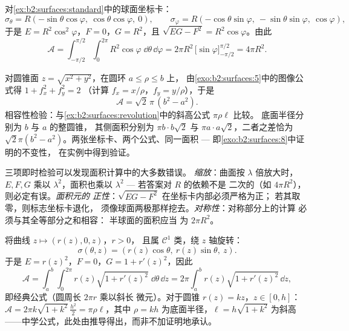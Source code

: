 \begin{example}[球面的面积]\label{ex:b2:surfaces:spherearea}
对\cref{ex:b2:surfaces:standard}中的球面坐标卡：
\[
\sigma_\theta = R(-\sin\theta\cos\varphi,\
\cos\theta\cos\varphi,\ 0),
\qquad
\sigma_\varphi = R(-\cos\theta\sin\varphi,\
-\sin\theta\sin\varphi,\ \cos\varphi),
\]
于是 $E = R^2\cos^2\varphi$，$F = 0$，$G = R^2$，且 $\sqrt{EG - F^2}
= R^2\cos\varphi$。由此
\[
\mathcal{A}
= \int_{-\pi/2}^{\pi/2}\!\!\int_0^{2\pi}
R^2\cos\varphi\;\dd\theta\,\dd\varphi
= 2\pi R^2\,\bigl[\sin\varphi\bigr]_{-\pi/2}^{\pi/2}
= \boxed{4\pi R^2} .
\]
\end{example}

\begin{example}[圆锥，
与中学公式核对]\label{ex:b2:surfaces:conearea}
对圆锥面 $z = \sqrt{x^2 + y^2}$，在圆环 $a \leq
\rho \leq b$ 上，
由\cref{exo:b2:surfaces:5}中的图像公式得 $1 + f_x^2 + f_y^2 = 2$
（计算 $f_x = x/\rho$，$f_y = y/\rho$），于是
\[
\mathcal A = \sqrt2\,\pi\,(b^2 - a^2) .
\]
相容性检验：与\cref{ex:b2:surfaces:revolution}中的斜高公式 $\pi\rho\ell$ 比较。
底面半径分别为 $b$ 与 $a$ 的整圆锥，
其侧面积分别为 $\pi b\cdot b\sqrt2$ 与
$\pi a\cdot a\sqrt2$，二者之差恰为
$\sqrt2\pi(b^2 - a^2)$。两张坐标卡、两个公式、同一面积
--- 即\cref{exo:b2:surfaces:8}中证明的不变性，
在实例中得到验证。
\end{example}

\begin{remark}[曲面面积的快速检验]
三项即时检验可以发现面积计算中的大多数错误。
\emph{缩放}：曲面按 $\lambda$ 倍放大时，
$E, F, G$ 乘以 $\lambda^2$，面积也乘以
$\lambda^2$ --- 若答案对 $R$ 的依赖不是
二次的（如 $4\pi R^2$），则必定有误。\emph{面积元的
正性}：$\sqrt{EG - F^2}$ 在坐标卡内部必须严格为正；
若其取零，则标志坐标卡退化，
须像球面两极那样挖去。\emph{对称性}：对称部分上的计算
必须与其全等部分之和相容：
半球面的面积应当
为 $2\pi R^2$。
\end{remark}

\begin{example}[旋转曲面]\label{ex:b2:surfaces:revolution}
将曲线 $z \mapsto (r(z), 0, z)$，$r > 0$，
且属 $\mathcal{C}^1$ 类，绕 $z$ 轴旋转：
\[
\sigma(\theta, z) = (r(z)\cos\theta,\ r(z)\sin\theta,\ z).
\]
于是 $E = r(z)^2$，$F = 0$，$G = 1 + r'(z)^2$，因此
\[
\mathcal{A} = \int_a^b\!\!\int_0^{2\pi}
r(z)\sqrt{1 + r'(z)^2}\;\dd\theta\,\dd z
= 2\pi\int_a^b r(z)\sqrt{1 + r'(z)^2}\,\dd z ,
\]
即经典公式（圆周长 $2\pi r$ 乘以斜长
微元）。对于圆锥 $r(z) = kz$，$z \in [0, h]$：$\mathcal
A = 2\pi k\sqrt{1 + k^2}\,\frac{h^2}{2} = \pi \rho \ell$，其中
$\rho = kh$ 为底面半径，$\ell = h\sqrt{1 + k^2}$ 为斜高
——中学公式，此处由推导得出，而非不加证明地承认。
\end{example}

